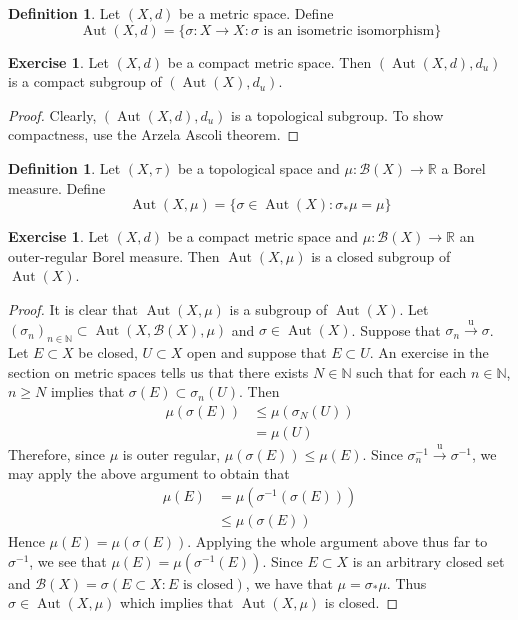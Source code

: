 \documentclass[12pt]{amsart}
\theoremstyle{definition}
\newtheorem{defn}[definition]{Definition}
\newtheorem{ex}[definition]{Exercise}
\newcommand{\sig}{\sigma}
\newcommand{\N}{\mathbb{N}}
\newcommand{\R}{\mathbb{R}}
\newcommand{\MB}{\mathcal{B}}
\newcommand{\convt}[1]{\xrightarrow{\text{#1}}}
\DeclareMathOperator{\Aut}{Aut}
\newcommand{\lex}[1]{\label{ex:#1}}
\newcommand{\ld}[1]{\label{defn:#1}}
\begin{document}
	\begin{defn} \ld{}
	Let $(X, d)$ be a metric space. Define 
	$$\Aut(X, d) = \{\sig:X\rightarrow X: \sig \text{ is an isometric isomorphism} \}$$  
	\end{defn}
	
	\begin{ex} \lex{}
	Let $(X, d)$ be a compact metric space. Then $(\Aut(X, d), d_u)$ is a compact subgroup of $(\Aut(X), d_u)$.
	\end{ex}
	
	\begin{proof}
	Clearly, $(\Aut(X, d), d_u)$ is a topological subgroup. To show compactness, use the Arzela Ascoli theorem.
	\end{proof}
	
	\begin{defn} \ld{}
	Let $(X, \tau)$ be a topological space and $\mu: \MB(X) \rightarrow \R$ a Borel measure. Define $$\Aut(X, \mu) = \{\sig \in \Aut(X): \sig_* \mu = \mu\}$$ 
	\end{defn}	
	
	\begin{ex} \lex{}
	Let $(X,d)$ be a compact metric space and $\mu: \MB(X) \rightarrow \R$ an outer-regular Borel measure. Then $\Aut(X, \mu)$ is a closed subgroup of $\Aut(X)$.
	\end{ex}
	
	\begin{proof}
	It is clear that $\Aut(X, \mu)$ is a subgroup of $\Aut(X)$. Let $(\sig_n)_{n \in \N} \subset \Aut(X, \MB(X), \mu)$ and $\sig \in \Aut(X)$. Suppose that $\sig_n \convt{u} \sig$. Let $E \subset X$ be closed, $U \subset X$ open and suppose that $E \subset U$. An exercise in the section on metric spaces tells us that there exists $N \in \N$ such that for each $n \in \N$, $n \geq N$ implies that $\sig(E) \subset \sig_n(U)$. Then 
	\begin{align*}
	\mu(\sig(E)) 
	&\leq \mu(\sig_N(U)) \\
	&= \mu(U) 
	\end{align*}
	Therefore, since $\mu$ is outer regular, $\mu(\sig(E)) \leq \mu(E)$. Since $\sig_n^{-1} \convt{u} \sig^{-1}$, we may apply the above argument to obtain that 
	\begin{align*}
	\mu(E) 
	&= \mu(\sig^{-1}(\sig (E))) \\
	&\leq  \mu(\sig(E))
\end{align*}	 
Hence $\mu(E) = \mu(\sig(E))$. Applying the whole argument above thus far to $\sig^{-1}$, we see that $\mu(E) = \mu(\sig^{-1}(E))$. Since $E \subset X$ is an arbitrary closed set and $\MB(X) = \sig(E \subset X: E \text{ is closed})$, we have that $\mu = \sig_*\mu$. Thus $\sig \in \Aut(X, \mu)$ which implies that $\Aut(X, \mu)$ is closed. 
	\end{proof}
	
\end{document}
